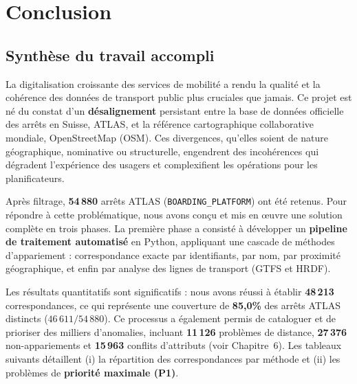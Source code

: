 \chapter*{Conclusion}


\section*{Synthèse du travail accompli}

La digitalisation croissante des services de mobilité a rendu la qualité et la cohérence des données de transport public plus cruciales que jamais. Ce projet est né du constat d'un \textbf{désalignement} persistant entre la base de données officielle des arrêts en Suisse, ATLAS, et la référence cartographique collaborative mondiale, OpenStreetMap (OSM). Ces divergences, qu'elles soient de nature géographique, nominative ou structurelle, engendrent des incohérences qui dégradent l'expérience des usagers et complexifient les opérations pour les planificateurs.

Après filtrage, \textbf{54\,880} arrêts ATLAS (\texttt{BOARDING\_PLATFORM}) ont été retenus. 
Pour répondre à cette problématique, nous avons conçu et mis en œuvre une solution complète en trois phases. La première phase a consisté à développer un \textbf{pipeline de traitement automatisé} en Python, appliquant une cascade de méthodes d'appariement : correspondance exacte par identifiants, par nom, par proximité géographique, et enfin par analyse des lignes de transport (GTFS et HRDF). 

Les résultats quantitatifs sont significatifs : nous avons réussi à établir \textbf{48\,213} correspondances, ce qui représente une couverture de \textbf{85,0\%} des arrêts ATLAS distincts (\(46\,611/54\,880\)). Ce processus a également permis de cataloguer et de prioriser des milliers d'anomalies, incluant \textbf{11\,126} problèmes de distance, \textbf{27\,376} non-appariements et \textbf{15\,963} conflits d'attributs (voir Chapitre~6). Les tableaux suivants détaillent (i) la répartition des correspondances par méthode et (ii) les problèmes de \textbf{priorité maximale (P1)}.

\vspace{0.5em}

